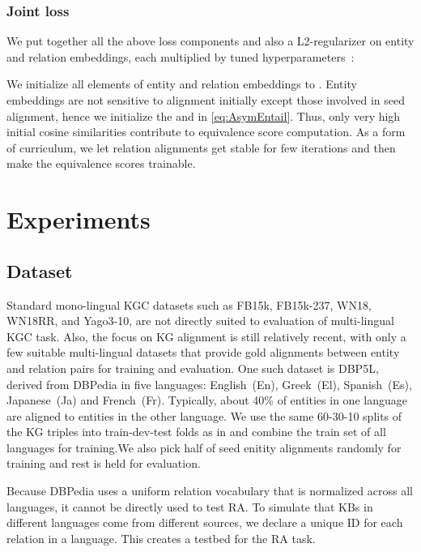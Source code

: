 \documentclass[11pt]{article}
\begin{document}
\subsubsection{Joint loss}

We put together all the above loss components and also a L2-regularizer  on entity and relation embeddings, each multiplied by tuned hyperparameters~:


We initialize all elements of entity and relation embeddings to .  Entity embeddings are not sensitive to alignment initially except those involved in seed alignment, hence we initialize the  and  in \eqref{eq:AsymEntail}.  Thus, only very high initial cosine similarities contribute to equivalence score computation.  As a form of curriculum, we let relation alignments get stable for few iterations and then make the equivalence scores trainable.
 

\section{Experiments}







\subsection{Dataset}

Standard mono-lingual KGC datasets such as FB15k, FB15k-237, WN18, WN18RR, and Yago3-10, are not directly suited to evaluation of multi-lingual KGC task.
Also, the focus on KG alignment is still relatively recent, with only a few suitable multi-lingual datasets that provide gold alignments between entity and relation pairs for training and evaluation. One such dataset is DBP5L, derived from DBPedia in five languages: English~(En), Greek~(El), Spanish~(Es), Japanese~(Ja) and French~(Fr).   Typically, about  40\% of entities in one language are aligned to entities in the other language. We  use the same 60-30-10 splits of the KG triples into train-dev-test folds as in \citet{chen-etal-2020-multilingual} and combine the train set of all languages for training.We also pick half of seed enitity alignments randomly for training and rest is held for evaluation. 

Because DBPedia uses a uniform relation vocabulary that is normalized across all languages, it cannot be directly used to test RA. To simulate that KBs in different languages come from different sources, we declare a unique ID for each relation in a language. This creates a testbed for the RA task.
\end{document}
